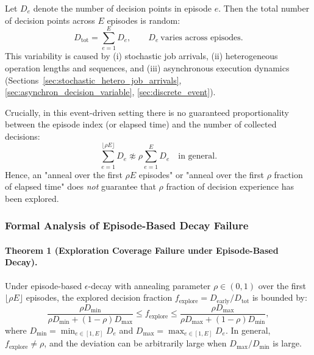 Let $D_e$ denote the number of decision points in episode $e$.
Then the total number of decision points across $E$ episodes is random:
\begin{equation}
D_{\text{tot}} = \sum_{e=1}^{E} D_e,
\qquad
D_e \ \text{varies across episodes}.
\label{eq:dynamic_total_decisions}
\end{equation}
This variability is caused by (i) stochastic job arrivals, (ii) heterogeneous
operation lengths and sequences, and (iii) asynchronous execution dynamics
(Sections~\ref{sec:stochastic_hetero_job_arrivals},
\ref{sec:asynchron_decision_variable},
\ref{sec:discrete_event}).

Crucially, in this event-driven setting there is no guaranteed proportionality
between the episode index (or elapsed time) and the number of collected decisions:
\begin{equation}
\sum_{e=1}^{\lfloor \rho E \rfloor} D_e
\not\approx
\rho \sum_{e=1}^{E} D_e
\quad \text{in general.}
\label{eq:no_fraction_guarantee}
\end{equation}
Hence, an "anneal over the first $\rho E$ episodes" or "anneal over the first
$\rho$ fraction of elapsed time" does \emph{not} guarantee that $\rho$ fraction
of decision experience has been explored.

\subsubsection{Formal Analysis of Episode-Based Decay Failure}

\paragraph{Theorem 1 (Exploration Coverage Failure under Episode-Based Decay).}
\label{thm:episode_decay_failure}
Under episode-based $\epsilon$-decay with annealing parameter $\rho \in (0,1)$
over the first $\lfloor \rho E \rfloor$ episodes, the explored decision fraction
$f_{\text{explore}} = D_{\text{early}}/D_{\text{tot}}$ is bounded by:
\begin{equation}
\frac{\rho D_{\min}}{\rho D_{\min} + (1-\rho) D_{\max}}
\leq f_{\text{explore}} \leq
\frac{\rho D_{\max}}{\rho D_{\max} + (1-\rho) D_{\min}},
\label{eq:exploration_bounds}
\end{equation}
where $D_{\min} = \min_{e \in [1,E]} D_e$ and $D_{\max} = \max_{e \in [1,E]} D_e$.
In general, $f_{\text{explore}} \neq \rho$, and the deviation can be arbitrarily
large when $D_{\max}/D_{\min}$ is large.

